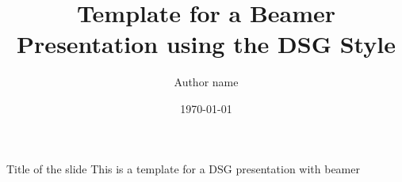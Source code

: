 \documentclass{beamer}
\title{Template for a Beamer Presentation using the DSG Style}
\author{Author name}
\institute{Distributed Systems Group - WIAI - University of Bamberg}
\date{\today}
\begin{document}
 \begin{frame}[plain]
	\titlepage
\end{frame}

\begin{frame}{Title of the slide}
This is a template for a DSG presentation with beamer
\end{frame}
\end{document}
